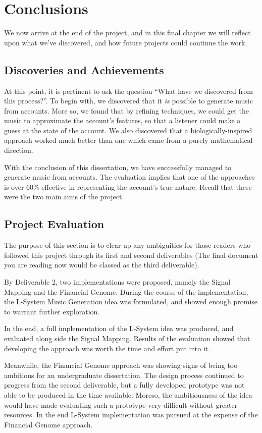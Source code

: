 \chapter{Conclusions}

We now arrive at the end of the project, and in this final chapter we will reflect upon what we've discovered, and how future projects could continue the work.

\section{Discoveries and Achievements}

At this point, it is pertinent to ask the question ``What have we discovered from this process?''. To begin with, we discovered that it \textit{is} possible to generate music from accounts. More so, we found that by refining techniques, we could get the music to approximate the account's features, so that a listener could make a guess at the state of the account. We also discovered that a biologically-inspired approach worked much better than one which came from a purely mathematical direction.

With the conclusion of this dissertation, we have successfully managed to generate music from accounts. The evaluation implies that one of the approaches is over 60\% effective in representing the account's true nature. Recall that these were the two main aims of the project.

\section{Project Evaluation}

The purpose of this section is to clear up any ambiguities for those readers who followed this project through its first and second deliverables (The final document you are reading now would be classed as the third deliverable).

By Deliverable 2, two implementations were proposed, namely the Signal Mapping and the Financial Genome. During the course of the implementation, the L-System Music Generation idea was formulated, and showed enough promise to warrant further exploration.

In the end, a full implementation of the L-System idea was produced, and evaluated along side the Signal Mapping. Results of the evaluation showed that developing the approach was worth the time and effort put into it.

Meanwhile, the Financial Genome approach was showing signs of being too ambitious for an undergraduate dissertation. The design process continued to progress from the second deliverable, but a fully developed prototype was not able to be produced in the time available. Moreso, the ambitiousness of the idea would have made evaluating such a prototype very difficult without greater resources. In the end L-System implementation was pursued at the expense of the Financial Genome approach.

